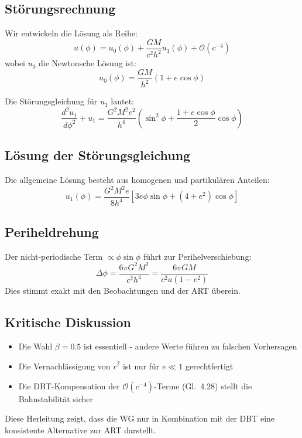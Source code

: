 \subsection{Störungsrechnung}
Wir entwickeln die Lösung als Reihe:
\begin{equation}
u(\phi) = u_0(\phi) + \frac{GM}{c^2h^2}u_1(\phi) + \mathcal{O}(c^{-4})
\end{equation}
wobei $u_0$ die Newtonsche Lösung ist:
\begin{equation}
u_0(\phi) = \frac{GM}{h^2}(1 + e\cos\phi)
\end{equation}

Die Störungsgleichung für $u_1$ lautet:
\begin{equation}
\frac{d^2u_1}{d\phi^2} + u_1 = \frac{G^2M^2e^2}{h^4}\left(\sin^2\phi + \frac{1 + e\cos\phi}{2}\cos\phi\right)
\end{equation}

\subsection{Lösung der Störungsgleichung}
Die allgemeine Lösung besteht aus homogenen und partikulären Anteilen:
\begin{equation}
u_1(\phi) = \frac{G^2M^2e}{8h^4}\left[3e\phi\sin\phi + (4 + e^2)\cos\phi\right]
\end{equation}

\subsection{Periheldrehung}
Der nicht-periodische Term $\propto \phi\sin\phi$ führt zur Perihelverschiebung:
\begin{equation}
\Delta\phi = \frac{6\pi G^2M^2}{c^2h^4} = \frac{6\pi GM}{c^2a(1 - e^2)}
\end{equation}
Dies stimmt exakt mit den Beobachtungen und der ART überein.

\subsection{Kritische Diskussion}
\begin{itemize}
\item Die Wahl $\beta = 0.5$ ist essentiell - andere Werte führen zu falschen Vorhersagen
\item Die Vernachlässigung von $\dot{r}^2$ ist nur für $e \ll 1$ gerechtfertigt
\item Die DBT-Kompensation der $\mathcal{O}(c^{-4})$-Terme (Gl.~4.28) stellt die Bahnstabilität sicher
\end{itemize}

Diese Herleitung zeigt, dass die WG nur in Kombination mit der DBT eine konsistente Alternative zur ART darstellt.
